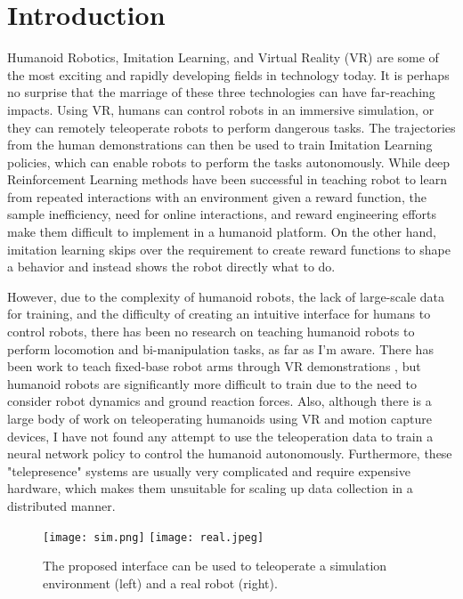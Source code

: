 \chapter{Introduction}


Humanoid Robotics, Imitation Learning, and Virtual Reality (VR) are some of the most exciting and rapidly developing fields in technology today. It is perhaps no surprise that the marriage of these three technologies can have far-reaching impacts. Using VR, humans can control robots in an immersive simulation, or they can remotely teleoperate robots to perform dangerous tasks. The trajectories from the human demonstrations can then be used to train Imitation Learning policies, which can enable robots to perform the tasks autonomously. While deep Reinforcement Learning methods have been successful in teaching robot to learn from repeated interactions with an environment given a reward function, the sample inefficiency, need for online interactions, and reward engineering efforts make them difficult to implement in a humanoid platform. On the other hand, imitation learning skips over the requirement to create reward functions to shape a behavior and instead shows the robot directly what to do. 

However, due to the complexity of humanoid robots, the lack of large-scale data for training, and the difficulty of creating an intuitive interface for humans to control robots, there has been no research on teaching humanoid robots to perform locomotion and bi-manipulation tasks, as far as I'm aware. There has been work to teach fixed-base robot arms through VR demonstrations \cite{zhang2018deep}, but humanoid robots are significantly more difficult to train due to the need to consider robot dynamics and ground reaction forces. Also, although there is a large body of work on teleoperating humanoids using VR and motion capture devices, I have not found any attempt to use the teleoperation data to train a neural network policy to control the humanoid autonomously. Furthermore, these "telepresence" systems are usually very complicated and require expensive hardware, which makes them unsuitable for scaling up data collection in a distributed manner.

\begin{figure}
	\centering
	\texttt{[image: sim.png]}
	\texttt{[image: real.jpeg]}
	\caption{The proposed interface can be used to teleoperate a simulation environment (left) and a real robot (right).}
    \label{fig:simreal}
\end{figure}


